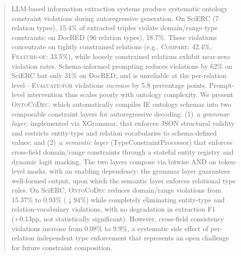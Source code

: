 \begin{abstract}
LLM-based information extraction systems produce systematic ontology constraint violations during autoregressive generation.
On SciERC (7 relation types), 15.4\% of extracted triples violate domain/range type constraints; on DocRED (96 relation types), 18.7\%.
These violations concentrate on tightly constrained relations (e.g., \textsc{Compare}: 42.4\%, \textsc{Feature-of}: 33.5\%), while loosely constrained relations exhibit near-zero violation rates.
%
Schema-informed prompting reduces violations by 62\% on SciERC but only 31\% on DocRED, and is unreliable at the per-relation level---\textsc{Evaluate-for} violations \emph{increase} by 5.8 percentage points.
Prompt-level intervention thus scales poorly with ontology complexity.
%
We present \textsc{OntoCoDec}, which automatically compiles IE ontology schemas into two composable constraint layers for autoregressive decoding:
(1)~a \emph{grammar layer}, implemented via XGrammar, that enforces JSON structural validity and restricts entity-type and relation vocabularies to schema-defined values; and
(2)~a \emph{semantic layer} (TypeConstraintProcessor) that enforces cross-field domain/range constraints through a stateful entity registry and dynamic logit masking.
The two layers compose via bitwise AND on token-level masks, with an enabling dependency: the grammar layer guarantees well-formed output, upon which the semantic layer enforces relational type rules.
%
On SciERC, \textsc{OntoCoDec} reduces domain/range violations from 15.37\% to 0.93\% ($\downarrow$94\%) while completely eliminating entity-type and relation-vocabulary violations, with no degradation in extraction F1 ({+}0.13pp, not statistically significant).
However, cross-field consistency violations increase from 0.08\% to 9.9\%, a systematic side effect of per-relation independent type enforcement that represents an open challenge for future constraint composition.
\end{abstract}
